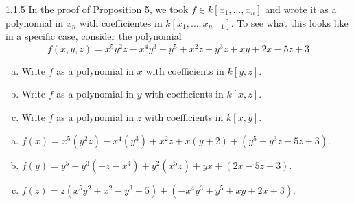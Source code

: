 \documentclass[twoside]{article}
\begin{document}
\newpage

\begin{ejercicio}{1.1.5}
In the proof of Proposition 5, we took $f \in k[x_1,\dots,x_n]$ and wrote it as a polynomial in $x_n$ with coefficientes in $k[x_1,\dots,x_{n-1}]$.
To see what this looks like in a specific case, consider the polynomial
\[ f(x,y,z) = x^5y^2z-x^4y^3+y^5+x^2z-y^3z+xy+2x-5z+3 \]
\begin{enumerate}[a.]
\item Write $f$ as a polynomial in $x$ with coefficients in $k[y,z]$.
\item Write $f$ as a polynomial in $y$ with coefficients in $k[x,z]$.
\item Write $f$ as a polynomial in $z$ with coefficients in $k[x,y]$.
\end{enumerate}
\end{ejercicio}
\begin{solucion}
\begin{enumerate}[a.]
\item $f(x)=x^5(y^2z)-x^4(y^3)+x^2z+x(y+2)+(y^5-y^3z-5z+3)$.
\item $f(y)=y^5+y^3(-z-x^4)+y^2(x^5z)+yx+(2x-5z+3)$.
\item $f(z)=z(x^5y^2+x^2-y^3-5)+(-x^4y^3+y^5+xy+2x+3)$.
\end{enumerate}
\end{solucion}

\newpage
\end{document}
